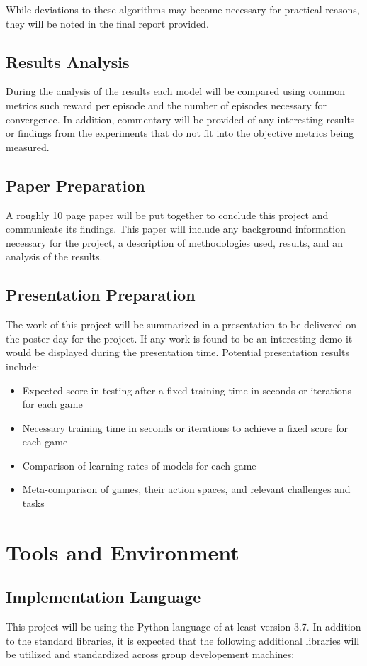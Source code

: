 \documentclass[conference]{IEEEtran}
\begin{document}
While deviations to these algorithms may become necessary for practical reasons, they will be noted in the final report provided.

\subsection{Results Analysis}
During the analysis of the results each model will be compared using common metrics such reward per episode and the number of episodes necessary for convergence.
In addition, commentary will be provided of any interesting results or findings from the experiments that do not fit into the objective metrics being measured.

\subsection{Paper Preparation}
A roughly 10 page paper will be put together to conclude this project and communicate its findings.
This paper will include any background information necessary for the project, a description of methodologies used, results, and an analysis of the results.

\subsection{Presentation Preparation}
The work of this project will be summarized in a presentation to be delivered on the poster day for the project.
If any work is found to be an interesting demo it would be displayed during the presentation time. Potential presentation results include:
\begin{itemize}
    \item Expected score in testing after a fixed training time in seconds or iterations for each game
    \item Necessary training time in seconds or iterations to achieve a fixed score for each game
    \item Comparison of learning rates of models for each game
    \item Meta-comparison of games, their action spaces, and relevant challenges and tasks
\end{itemize}

\section{Tools and Environment}

\subsection{Implementation Language}
This project will be using the Python language of at least version 3.7.
In addition to the standard libraries, it is expected that the following additional libraries will be utilized and standardized across group developement machines:
 
\end{document}
